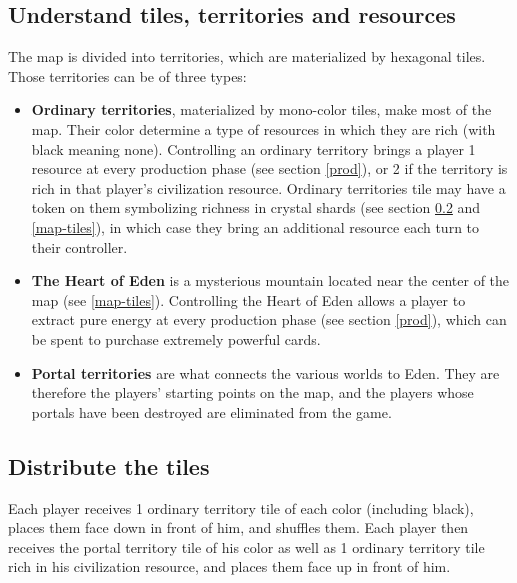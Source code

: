 \documentclass[a4paper]{article}
\begin{document}
    \subsection{Understand tiles, territories and resources}
        The map is divided into territories, which are materialized by hexagonal tiles.
        Those territories can be of three types:
         \vspace{-1.3em}
        \begin{itemize}
            \item \textbf{Ordinary territories}, materialized by mono-color tiles,
                make most of the map.
                Their color determine a type of resources in which they are rich
                (with black meaning none).
                Controlling an ordinary territory brings a player 1 resource at every
                production phase (see section \ref{prod}), or 2 if the territory is rich
                in that player's civilization resource.
                Ordinary territories tile may have a token on them symbolizing richness
                in crystal shards (see section \ref{tile-distribution} and \ref{map-tiles}),
                in which case they bring an additional resource each turn to their controller.
            
            \item \textbf{The Heart of Eden} is a mysterious mountain located near
                the center of the map (see \ref{map-tiles}).
                Controlling the Heart of Eden allows a player to extract
                pure energy at every production phase (see section \ref{prod}),
                which can be spent to purchase extremely powerful cards.
            
            \item \textbf{Portal territories} are what connects the various worlds
                to Eden.
                They are therefore the players' starting points on the map,
                and the players whose portals have been destroyed are eliminated from
                the game.
        \end{itemize}   

    \subsection{Distribute the tiles}
        \label{tile-distribution}
        Each player receives 1 ordinary territory tile of each color (including black),
        places them face down in front of him, and shuffles them.
        Each player then receives the portal territory tile of his color
        as well as 1 ordinary territory tile rich in his civilization resource,
        and places them face up in front of him.
        
\end{document}
